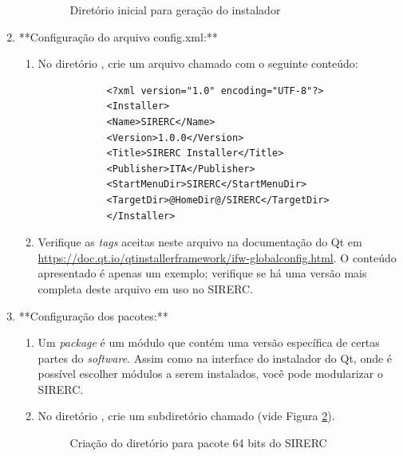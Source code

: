 \documentclass[a4paper,11pt]{article}
\newcommand{\sistema}{\textsf{SIRERC}}
\begin{document}
\begin{enumerate}
\begin{enumerate}
		\begin{figure}[H]\centering
			\caption{Diretório inicial para geração do instalador}\label{fig:sirercinstallerdir}
		\end{figure}
	\end{enumerate}
	
	\item **Configuração do arquivo config.xml:**
	\begin{enumerate}
		\item No diretório , crie um arquivo chamado  com o seguinte conteúdo:
		
		\begin{lstlisting}
			<?xml version="1.0" encoding="UTF-8"?>
			<Installer>
			<Name>SIRERC</Name>
			<Version>1.0.0</Version>
			<Title>SIRERC Installer</Title>
			<Publisher>ITA</Publisher>
			<StartMenuDir>SIRERC</StartMenuDir>
			<TargetDir>@HomeDir@/SIRERC</TargetDir>
			</Installer>
		\end{lstlisting}
		
		\item Verifique as \emph{tags} aceitas neste arquivo na documentação do Qt em \url{https://doc.qt.io/qtinstallerframework/ifw-globalconfig.html}. O conteúdo apresentado é apenas um exemplo; verifique se há uma versão mais completa deste arquivo em uso no \sistema{}.
	\end{enumerate}
	
	\item **Configuração dos pacotes:**
	\begin{enumerate}
		\item Um \emph{package} é um módulo que contém uma versão específica de certas partes do \emph{software}. Assim como na interface do instalador do Qt, onde é possível escolher módulos a serem instalados, você pode modularizar o \sistema{}.
		\item No diretório , crie um subdiretório chamado  (vide Figura \ref{fig:sirercinstallerpackage}).
		
		\begin{figure}[H]\centering
			\caption{Criação do diretório para pacote 64 bits do \sistema{}}\label{fig:sirercinstallerpackage}
		\end{figure}
		

\end{enumerate}
\end{enumerate}
\end{document}
